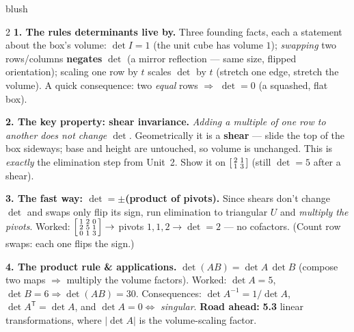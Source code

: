 \documentclass[10pt]{article}
\newcommand{\T}{\mathsf{T}}
\begin{document}
\begin{skillbox}[Lesson]{blush}
\begin{multicols}{2}
\textbf{1. The rules determinants live by.} Three founding facts, each a statement about the box's
volume: $\det I=1$ (the unit cube has volume $1$); \emph{swapping} two rows/columns \textbf{negates}
$\det$ (a mirror reflection --- same size, flipped orientation); scaling one row by $t$ scales $\det$
by $t$ (stretch one edge, stretch the volume). A quick consequence: two \emph{equal} rows $\Rightarrow$
$\det=0$ (a squashed, flat box).

\textbf{2. The key property: shear invariance.} \emph{Adding a multiple of one row to another does not
change $\det$.} Geometrically it is a \textbf{shear} --- slide the top of the box sideways; base and
height are untouched, so volume is unchanged. This is \emph{exactly} the elimination step from Unit~2.
Show it on $\begin{bsmallmatrix} 2 & 1\\ 1 & 3 \end{bsmallmatrix}$ (still $\det=5$ after a shear).

\columnbreak

\textbf{3. The fast way: $\det=\pm$(product of pivots).} Since shears don't change $\det$ and swaps
only flip its sign, run elimination to triangular $U$ and \emph{multiply the pivots}. Worked:
$\begin{bsmallmatrix} 1 & 2 & 0\\ 2 & 5 & 1\\ 0 & 1 & 3 \end{bsmallmatrix}\to$ pivots $1,1,2\to\det=2$
--- no cofactors. (Count row swaps: each one flips the sign.)

\textbf{4. The product rule \& applications.} $\det(AB)=\det A\,\det B$ (compose two maps $\Rightarrow$
multiply the volume factors). Worked: $\det A=5$, $\det B=6\Rightarrow\det(AB)=30$. Consequences:
$\det A^{-1}=1/\det A$, $\det A^{\T}=\det A$, and $\det A=0\Leftrightarrow$ \emph{singular}. \textbf{Road
ahead:} \textbf{5.3} linear transformations, where $|\det A|$ is the volume-scaling factor.
\end{multicols}
\end{skillbox}
\end{document}
